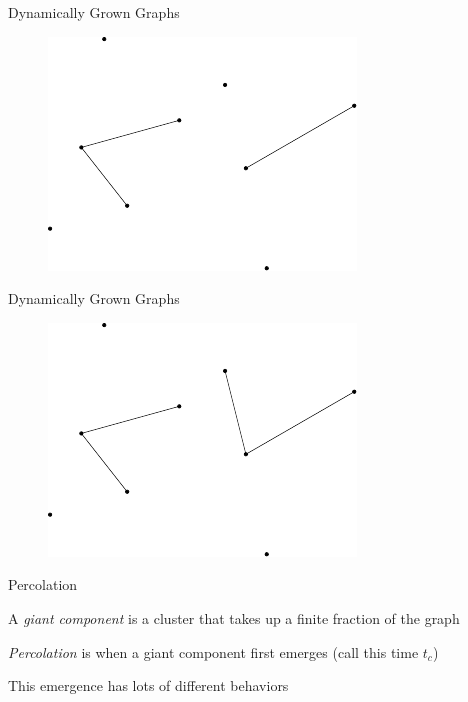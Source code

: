 \documentclass{beamer}
\newcommand{\nl}{
\vspace{5mm}

}
\begin{document}
\begin{frame}{Dynamically Grown Graphs}
        \begin{figure}[H]
                \centering
                \includegraphics[scale=1]{fig/graph-4.pdf}
        \end{figure}
\end{frame}
\begin{frame}{Dynamically Grown Graphs}
        \begin{figure}[H]
                \centering
                \includegraphics[scale=1]{fig/graph-5.pdf}
        \end{figure}
\end{frame}

\begin{frame}{Percolation}
	
	A \emph{giant component} is a cluster that takes up a finite fraction of the graph \nl

	\emph{Percolation} is when a giant component first emerges (call this time $t_c$) \nl

	\pause
	This emergence has lots of different behaviors
\end{frame}
\end{document}
